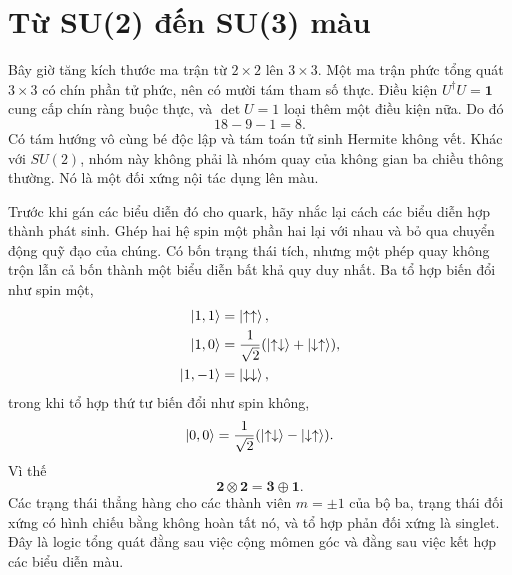 \begin{classroomqa}
\end{classroomqa}

\begin{classroomqa}
\end{classroomqa}

\section{Từ SU(2) đến SU(3) màu}

Bây giờ tăng kích thước ma trận từ \(2\times2\) lên \(3\times3\). Một ma trận phức tổng quát
\(3\times3\) có chín phần tử phức, nên có mười tám tham số thực.
Điều kiện \(U^\dagger U=\boldsymbol 1\) cung cấp chín ràng buộc thực,
và \(\det U=1\) loại thêm một điều kiện nữa. Do đó
\begin{equation}
18-9-1=8.
\end{equation}
Có tám hướng vô cùng bé độc lập và tám toán tử sinh Hermite không vết. Khác với \(SU(2)\), nhóm này không phải là nhóm quay của không gian ba chiều thông thường. Nó là một đối xứng nội tác dụng lên màu.

Trước khi gán các biểu diễn đó cho quark, hãy nhắc lại cách các biểu diễn hợp thành phát sinh. Ghép hai hệ spin một phần hai lại với nhau và bỏ qua chuyển động quỹ đạo của chúng. Có bốn trạng thái tích, nhưng một phép quay không trộn lẫn cả bốn thành một biểu diễn bất khả quy duy nhất. Ba tổ hợp biến đổi như spin một,
\begin{align}
\left\lvert1,1\right\rangle&=\left\lvert\uparrow\uparrow\right\rangle,\\
\left\lvert1,0\right\rangle&=\frac{1}{\sqrt2}
(\left\lvert\uparrow\downarrow\right\rangle+\left\lvert\downarrow\uparrow\right\rangle),\\
\left\lvert1,-1\right\rangle&=\left\lvert\downarrow\downarrow\right\rangle,
\end{align}
trong khi tổ hợp thứ tư biến đổi như spin không,
\begin{equation}
\left\lvert0,0\right\rangle=\frac{1}{\sqrt2}
(\left\lvert\uparrow\downarrow\right\rangle-\left\lvert\downarrow\uparrow\right\rangle).
\end{equation}
Vì thế
\begin{equation}
\boldsymbol 2\otimes\boldsymbol 2
=\boldsymbol 3\oplus\boldsymbol 1.
\label{eq:l4-two-spin-decomposition}
\end{equation}
Các trạng thái thẳng hàng cho các thành viên \(m=\pm1\) của bộ ba, trạng thái đối xứng có hình chiếu bằng không hoàn tất nó, và tổ hợp phản đối xứng là singlet. Đây là logic tổng quát đằng sau việc cộng mômen góc và đằng sau việc kết hợp các biểu diễn màu.

